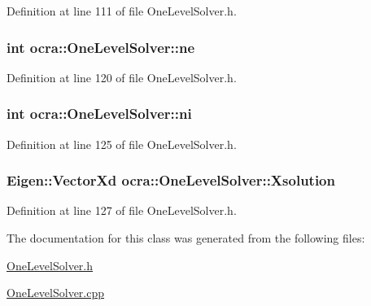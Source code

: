 Definition at line 111 of file One\+Level\+Solver.\+h.

\subsubsection[{\texorpdfstring{ne}{ne}}]{\setlength{\rightskip}{0pt plus 5cm}int ocra\+::\+One\+Level\+Solver\+::ne\hspace{0.3cm}{\ttfamily [protected]}}\hypertarget{classocra_1_1OneLevelSolver_aeb834ab417c238bca2003c630703dbf8}{}\label{classocra_1_1OneLevelSolver_aeb834ab417c238bca2003c630703dbf8}


Definition at line 120 of file One\+Level\+Solver.\+h.

\subsubsection[{\texorpdfstring{ni}{ni}}]{\setlength{\rightskip}{0pt plus 5cm}int ocra\+::\+One\+Level\+Solver\+::ni\hspace{0.3cm}{\ttfamily [protected]}}\hypertarget{classocra_1_1OneLevelSolver_a8746c04321945142300adc9883992fa7}{}\label{classocra_1_1OneLevelSolver_a8746c04321945142300adc9883992fa7}


Definition at line 125 of file One\+Level\+Solver.\+h.

\subsubsection[{\texorpdfstring{Xsolution}{Xsolution}}]{\setlength{\rightskip}{0pt plus 5cm}Eigen\+::\+Vector\+Xd ocra\+::\+One\+Level\+Solver\+::\+Xsolution\hspace{0.3cm}{\ttfamily [protected]}}\hypertarget{classocra_1_1OneLevelSolver_a6292cf12a5c6ae5a498a0962272a4b40}{}\label{classocra_1_1OneLevelSolver_a6292cf12a5c6ae5a498a0962272a4b40}


Definition at line 127 of file One\+Level\+Solver.\+h.



The documentation for this class was generated from the following files\+:\begin{DoxyCompactItemize}
\item 
\hyperlink{OneLevelSolver_8h}{One\+Level\+Solver.\+h}\item 
\hyperlink{OneLevelSolver_8cpp}{One\+Level\+Solver.\+cpp}\end{DoxyCompactItemize}
